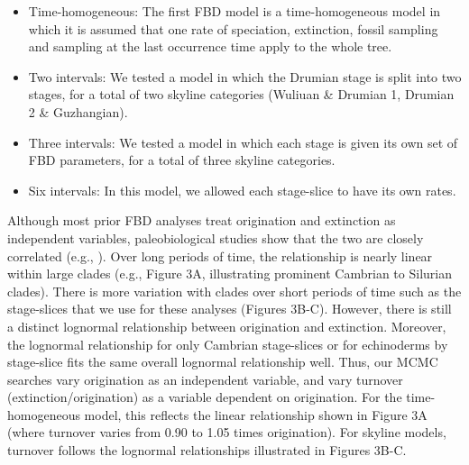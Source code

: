 \documentclass{article}
\begin{document}
\begin{itemize}
\item Time-homogeneous: The first FBD model is a time-homogeneous model in which it is assumed that one rate of speciation, extinction, fossil sampling and sampling at the last occurrence time apply to the whole tree. 
\item Two intervals: We tested a model in which the Drumian stage is split into two stages, for a total of two skyline categories (Wuliuan \& Drumian 1, Drumian 2 \& Guzhangian).
\item Three intervals: We tested a model in which each stage is given its own set of FBD parameters, for a total of three skyline categories.
\item Six intervals: In this model, we allowed each stage-slice to have its own rates.
\end{itemize}
Although most prior FBD analyses treat origination and extinction as independent variables, paleobiological studies show that the two are closely correlated (e.g., \citep{Marshall2017}). 
Over long periods of time, the relationship is nearly linear within large clades (e.g., Figure 3A, illustrating prominent Cambrian to Silurian clades). 
There is more variation with clades over short periods of time such as the stage-slices that we use for these analyses (Figures 3B-C). 
However, there is still a distinct lognormal relationship between origination and extinction. Moreover, the lognormal relationship for only Cambrian stage-slices or for echinoderms by stage-slice fits the same overall lognormal relationship well.  
Thus, our MCMC searches vary origination as an independent variable, and vary turnover (extinction/origination) as a variable dependent on origination. For the time-homogeneous model, this reflects the linear relationship shown in Figure 3A (where turnover varies from 0.90 to 1.05 times origination).
For skyline models, turnover follows the lognormal relationships illustrated in Figures 3B-C.
\end{document}
